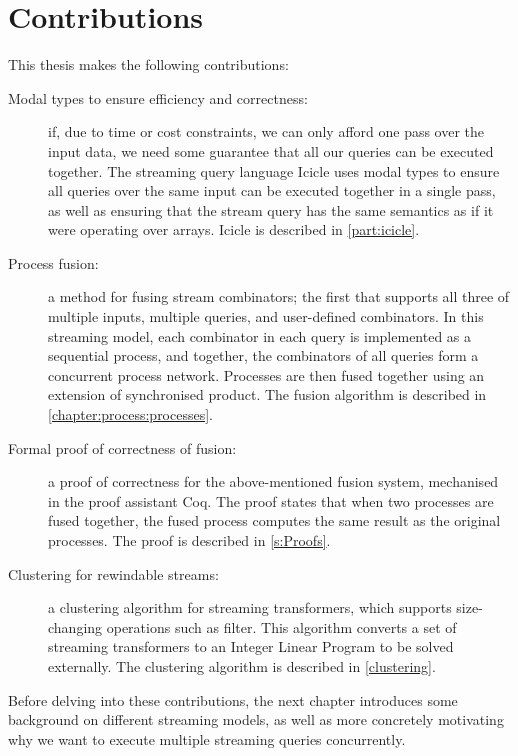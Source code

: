 \section{Contributions}

This thesis makes the following contributions:

\begin{description}
\item[Modal types to ensure efficiency and correctness:]
if, due to time or cost constraints, we can only afford one pass over the input data, we need some guarantee that all our queries can be executed together.
The streaming query language Icicle uses modal types to ensure all queries over the same input can be executed together in a single pass, as well as ensuring that the stream query has the same semantics as if it were operating over arrays.
Icicle is described in \cref{part:icicle}.

\item[Process fusion:]
a method for fusing stream combinators; the first that supports all three of multiple inputs, multiple queries, and user-defined combinators.
In this streaming model, each combinator in each query is implemented as a sequential process, and together, the combinators of all queries form a concurrent process network.
Processes are then fused together using an extension of synchronised product.
The fusion algorithm is described in \cref{chapter:process:processes}.

\item[Formal proof of correctness of fusion:]
a proof of correctness for the above-mentioned fusion system, mechanised in the proof assistant Coq.
The proof states that when two processes are fused together, the fused process computes the same result as the original processes.
The proof is described in \cref{s:Proofs}.

\item[Clustering for rewindable streams:]
a clustering algorithm for streaming transformers, which supports size-changing operations such as filter.
This algorithm converts a set of streaming transformers to an Integer Linear Program to be solved externally.
The clustering algorithm is described in \cref{clustering}.

\end{description}

Before delving into these contributions, the next chapter introduces some background on different streaming models, as well as more concretely motivating why we want to execute multiple streaming queries concurrently.

